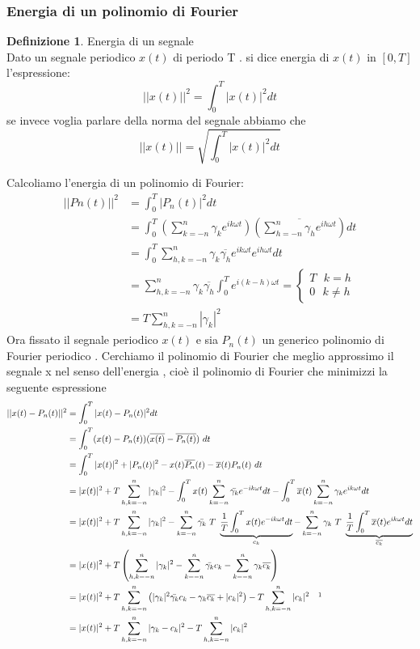 \documentclass{article}
\theoremstyle{definition}
\newtheorem*{definizione}{Definizione}
\newcommand{\inT}{\int_{0}^{T} }
\begin{document}
\subsubsection{Energia di un polinomio di Fourier}

\begin{definizione}
	Energia di un segnale \\
Dato un segnale periodico $x(t)$ di periodo T . si dice energia di $x(t)$ in $[0,T]$ l'espressione:
$$||x(t)||^2=\int_{0}^{T}|x(t)|^2dt$$ 
se invece voglia parlare della norma del segnale abbiamo che 
$$||x(t)||=\sqrt{\int_{0}^{T}|x(t)|^2dt}$$
\end{definizione}
Calcoliamo l'energia di un polinomio di Fourier:
\begin{align*}
||Pn(t)||^2&=\int_0^T |P_n(t)|^2dt\\
&=\int_{0}^{T}\left(\sum_{k=-n}^n \gamma_ke^{ik\omega t}\right )\left(\overline{\sum_{h=-n}^n \gamma_he^{ih\omega t}} \right) dt\\
&=\int_{0}^{T} \sum_{h,k=-n}^n \gamma_{k} \overline{\gamma_h} e^{ik\omega t}e^{ih\omega t} dt\\
&= \sum_{h,k=-n}^n \gamma_{k} \overline{\gamma_h}\int_{0}^{T}e^{i(k-h)\omega t}=\begin{cases}
	T \ \ \ k=h\\
	0 \ \ \ k\neq h 
\end{cases} \\
&=T\sum_{h,k=-n}^n |\gamma_{k}|^2 
\end{align*}
Ora fissato il segnale periodico $x(t)$ e sia $P_n(t)$ un generico polinomio di Fourier periodico . Cerchiamo il polinomio di Fourier che meglio approssimo il segnale x nel senso dell'energia , cioè il polinomio di Fourier che minimizzi la seguente espressione 
\begin{align*}
	||x(t)-P_n(t)||^2&= \int_{0}^{T}  |x(t)-P_n(t)|^2 dt \\ 
	&=\int_{0}^{T} (x(t)-P_n(t))(\overline{x(t)}-\overline{P_n(t)})\ dt\\
	&= \int_{0}^{T} |x (t)|^2+|P_n(t)|^2 - x(t)\overline{P_n}(t)-\overline{x}(t)P_n(t)\ dt\\
	&= |x (t)|^2 +T\sum_{h,k=-n}^n |\gamma_{k}|^2  - \inT x(t) \sum_{k=-n}^n \bar{\gamma_k}e^{-ik\omega t}dt  - \inT \overline{x}(t)\sum_{k=-n}^n \gamma_ke^{ik\omega t}dt\\
	&=  |x (t)|^2 +T\sum_{h,k=-n}^n |\gamma_{k}|^2 - \sum_{k=-n}^n \bar{\gamma_k} \ T \ \underbrace{\frac{1}{T}\inT x(t) e^{-ik\omega t}dt}_{c_k} -\sum_{k=-n}^n \gamma_k \ T \ \underbrace{\frac{1}{T}\inT \overline{x}(t)e^{ik\omega t}dt}_{\overline{c_k}}\\
	&= |x (t)|^2 +T\left(\sum_{h,k=-n}^n |\gamma_{k}|^2 -\sum_{k=-n}^n \bar{\gamma_k}  c_k- \sum_{k=-n}^n \gamma_k \overline{c_k}\right)\\
	&= |x (t)|^2 +T\sum_{h,k=-n}^n \left( |\gamma_{k}|^2 \bar{\gamma_k}  c_k-\gamma_k \overline{c_k} +|c_k|^2\right) - T \sum_{h,k=-n}^n |c_k|^2 \ \ \ \footnotemark
\\
&=|x (t)|^2 +T\sum_{h,k=-n}^n |\gamma_k-c_k|^2 - T \sum_{h,k=-n}^n |c_k|^2 
			\end{align*}
\end{document}
